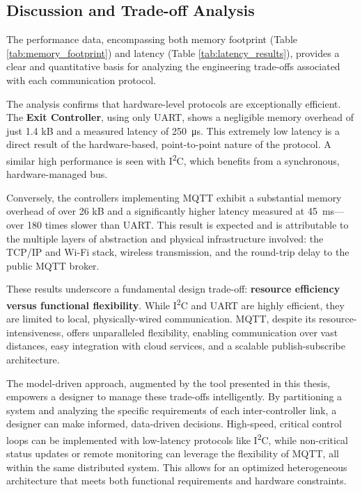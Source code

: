 \subsection{Discussion and Trade-off Analysis}
\label{subsec:discussion}

The performance data, encompassing both memory footprint (Table \ref{tab:memory_footprint}) and latency (Table \ref{tab:latency_results}), provides a clear and quantitative basis for analyzing the engineering trade-offs associated with each communication protocol.

The analysis confirms that hardware-level protocols are exceptionally efficient. The \textbf{Exit Controller}, using only UART, shows a negligible memory overhead of just 1.4 kB and a measured latency of \SI{250}{\micro\second}. This extremely low latency is a direct result of the hardware-based, point-to-point nature of the protocol. A similar high performance is seen with I\textsuperscript{2}C, which benefits from a synchronous, hardware-managed bus.

Conversely, the controllers implementing MQTT exhibit a substantial memory overhead of over 26 kB and a significantly higher latency measured at \SI{45}{\milli\second}—over 180 times slower than UART. This result is expected and is attributable to the multiple layers of abstraction and physical infrastructure involved: the TCP/IP and Wi-Fi stack, wireless transmission, and the round-trip delay to the public MQTT broker.

These results underscore a fundamental design trade-off: \textbf{resource efficiency versus functional flexibility}. While I\textsuperscript{2}C and UART are highly efficient, they are limited to local, physically-wired communication. MQTT, despite its resource-intensiveness, offers unparalleled flexibility, enabling communication over vast distances, easy integration with cloud services, and a scalable publish-subscribe architecture.

The model-driven approach, augmented by the tool presented in this thesis, empowers a designer to manage these trade-offs intelligently. By partitioning a system and analyzing the specific requirements of each inter-controller link, a designer can make informed, data-driven decisions. High-speed, critical control loops can be implemented with low-latency protocols like I\textsuperscript{2}C, while non-critical status updates or remote monitoring can leverage the flexibility of MQTT, all within the same distributed system. This allows for an optimized heterogeneous architecture that meets both functional requirements and hardware constraints.



